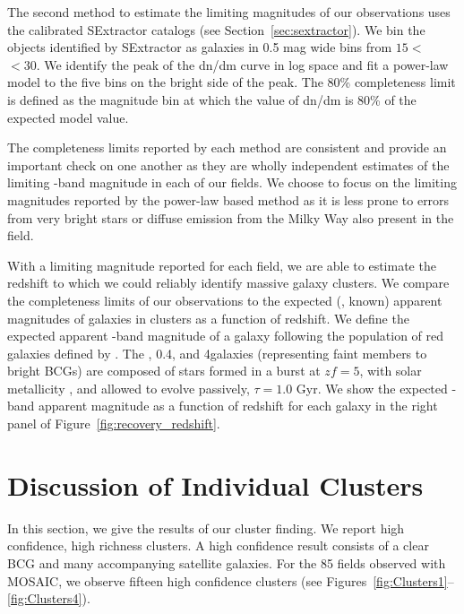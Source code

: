\documentclass[apj, revtex4-1]{emulateapj}
\begin{document}
The second method to estimate the limiting magnitudes of our observations uses the calibrated SExtractor catalogs (see Section~\ref{sec:sextractor}). We bin the objects identified by SExtractor as galaxies in 0.5 mag wide bins from $15<$ \sdssi\ $<30$. We identify the peak of the dn/dm curve in log space and fit a power-law model to the five bins on the bright side of the peak. The 80\% completeness limit is defined as the magnitude bin at which the value of dn/dm is 80\% of the expected model value.

The completeness limits reported by each method are consistent and provide an important check on one another as they are wholly independent estimates of the limiting \sdssi-band magnitude in each of our fields. We choose to focus on the limiting magnitudes reported by the power-law based method as it is less prone to errors from very bright stars or diffuse emission from the Milky Way also present in the field.

With a limiting magnitude reported for each field, we are able to estimate the redshift to which we could reliably identify massive galaxy clusters. We compare the completeness limits of our observations to the expected (\ie, known) apparent magnitudes of galaxies in clusters as a function of redshift. We define the expected apparent \sdssi-band magnitude of a galaxy following the population of red galaxies defined by \cite{Blanton2003}. The \lstar, 0.4\lstar, and 4\lstar galaxies (representing faint members to bright BCGs) are composed of stars formed in a burst at $zf = 5$, with solar metallicity \citep{Bruzual2003}, and allowed to evolve passively, $\tau = 1.0$ Gyr. We show the expected \sdssi-band apparent magnitude as a function of redshift for each galaxy in the right panel of Figure~\ref{fig:recovery_redshift}.

\section{Discussion of Individual Clusters}\label{sec:results}
In this section, we give the results of our cluster finding. We report high confidence, high richness clusters. A high confidence result consists of a clear BCG and many accompanying satellite galaxies. For the 85 fields observed with MOSAIC, we observe fifteen high confidence clusters (see Figures~\ref{fig:Clusters1}--\ref{fig:Clusters4}).
\end{document}
